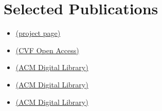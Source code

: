 \documentclass[11pt,a4paper,unicode]{moderncv}
\begin{document}
\section{Selected Publications}
\begin{itemize}[leftmargin=1cm,itemsep=0.3ex]
    \small
    \item {}
        \href{https://cseweb.ucsd.edu/~viscomp/projects/SIG22CovectorFluids/}{(project page)}
    \item {}
    \href{https://openaccess.thecvf.com/content/CVPR2022/papers/Palmer_DeepCurrents_Learning_Implicit_Representations_of_Shapes_With_Boundaries_CVPR_2022_paper.pdf}{(CVF Open Access)}
    \item {}
        \href{https://dl.acm.org/doi/10.1145/3450626.3459781}{(ACM Digital Library)}
    \item {}
    \href{https://dl.acm.org/doi/10.1145/3355089.3356537}{(ACM Digital Library)}
    \item {}
    \href{https://dl.acm.org/doi/10.1145/3340259}{(ACM Digital Library)}
\end{itemize}
\end{document}
